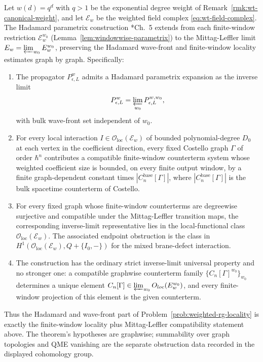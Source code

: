 \begin{thm}\label{thm:hadamard-mittag-leffler}
  Let $w(d)=q^d$ with $q>1$ be the exponential degree weight of
  Remark~\ref{rmk:wt-canonical-weight}, and let $\mathcal E_w$ be the
  weighted field complex \eqref{eq:wt-field-complex}. The Hadamard
  parametrix construction
  \cite{costello-renormalization}*{Ch.~5} extends from each
  finite-window restriction $\mathcal E_w^{w_0}$
  (Lemma~\ref{lem:windowwise-parametrix}) to the Mittag-Leffler
  limit $\mathcal E_w=\varprojlim_{w_0}\mathcal E_w^{w_0}$,
  preserving the Hadamard wave-front and finite-window locality
  estimates graph by graph. Specifically:
  \begin{enumerate}[label=(\roman*)]
    \item The propagator $P_{\epsilon,L}^{w}$ admits a Hadamard
      parametrix expansion as the inverse limit
      \[
        P_{\epsilon,L}^{w}
          =\varprojlim_{w_0}P_{\epsilon,L}^{w,w_0},
      \]
      with bulk wave-front set independent of $w_0$.
    \item For every local interaction
      $I\in\mathcal O_{\mathrm{loc}}(\mathcal E_w)$ of bounded
      polynomial-degree $D_0$ at each vertex in the coefficient
      direction, every fixed Costello graph $\Gamma$ of order
      $\hbar^n$ contributes a compatible finite-window counterterm
      system whose weighted coefficient size is bounded, on every
      finite output window, by a finite graph-dependent constant times
      $|C_n^{\mathrm{base}}[\Gamma]|$, where
      $|C_n^{\mathrm{base}}[\Gamma]|$ is the bulk spacetime
      counterterm of Costello.
    \item For every fixed graph whose finite-window counterterms are
      degreewise surjective and compatible under the Mittag-Leffler
      transition maps, the corresponding inverse-limit representative
      lies in the local-functional class
      \(\mathcal O_{\mathrm{loc}}(\mathcal E_w)\). The associated
      endpoint obstruction is the class in
      $H^1(\mathcal O_{\mathrm{loc}}(\mathcal E_w),Q+\{I_0,-\})$
      for the mixed brane-defect interaction.
    \item The construction has the ordinary strict inverse-limit
      universal property and no stronger one: a compatible graphwise
      counterterm family
      \(\{C_n[\Gamma]^{w_0}\}_{w_0}\) determines a unique element
      \(C_n[\Gamma]\in
      \varprojlim_{w_0}\mathcal O_{\mathrm{loc}}(\mathcal E_w^{w_0})\),
      and every finite-window projection of this element is the given
      counterterm.
  \end{enumerate}
  Thus the Hadamard and wave-front part of
  Problem~\ref{prob:weighted-rg-locality} is exactly the
  finite-window locality plus Mittag-Leffler compatibility statement
  above.  The theorem's hypotheses are graphwise; summability over graph
  topologies and QME vanishing are the separate obstruction data recorded
  in the displayed cohomology group.
\end{thm}

